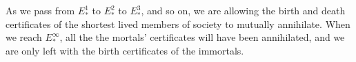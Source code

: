 \documentclass[11pt]{article}
\begin{document}
\begin{Births Deaths and Marriages}
As we pass from $E_*^1$ to $E_*^2$ to $E_*^3$, and so on, we are allowing the
birth and death certificates of the shortest lived members of society to
mutually annihilate. When we reach $E_*^\infty$, all the the mortals'
certificates will have been annihilated, and we are only left with the birth
certificates of the immortals.
%

\end{Births Deaths and Marriages}
\end{document}
